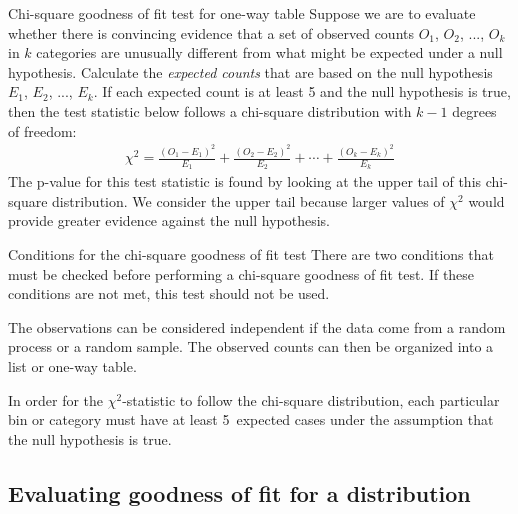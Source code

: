 \begin{onebox}{Chi-square goodness of fit test for one-way table}
Suppose we are to evaluate whether there is convincing evidence that a set of observed counts $O_1$, $O_2$, ..., $O_k$ in $k$ categories are unusually different from what might be expected under a null hypothesis. Calculate the \emph{expected counts} that are based on the null hypothesis $E_1$, $E_2$, ..., $E_k$. If each expected count is at least 5 and the null hypothesis is true, then the test statistic below follows a chi-square distribution with $k-1$ degrees of freedom:
\begin{align*}
\chi^2 = \frac{(O_1 - E_1)^2}{E_1} + \frac{(O_2 - E_2)^2}{E_2} + \cdots + \frac{(O_k - E_k)^2}{E_k}
\end{align*}
The p-value for this test statistic is found by looking at the upper tail of this chi-square distribution. We consider the upper tail because larger values of $\chi^2$ would provide greater evidence against the null hypothesis.\end{onebox}

\begin{onebox}{Conditions for the chi-square goodness of fit test}
There are two conditions that must be checked before performing a chi-square goodness of fit test. If these conditions are not met, this test should not be used.\vspace{-1mm}
\begin{description}
\setlength{\itemsep}{0mm}
\item[Independent.] The observations can be considered independent if the data come from a random process or a random sample.  The observed counts can then be organized into a list or one-way table.
\item[All expected counts at least 5.] In order for the $\chi^2$-statistic to follow the chi-square distribution, each particular bin or category must have at least \mbox{5~expected} cases under the assumption that the null hypothesis is true.
\vspace{-2mm}
\end{description}
\end{onebox}


\D{\newpage}

\subsection{Evaluating goodness of fit for a distribution}

